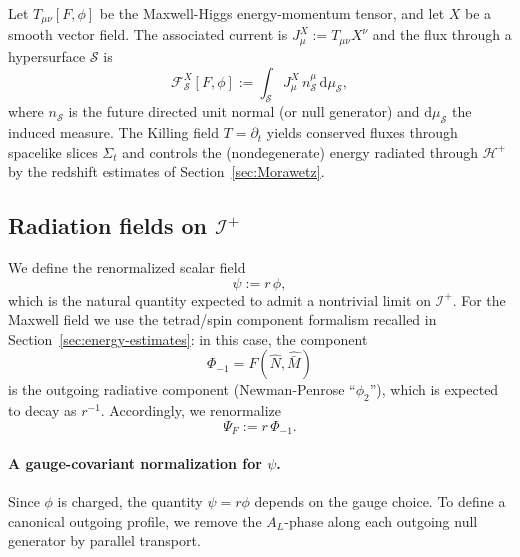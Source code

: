 \documentclass[11pt]{article}
\numberwithin{equation}{section}
\theoremstyle{plain}
\theoremstyle{definition}
\theoremstyle{remark}
\newcommand{\dd}{\mathrm{d}}
\begin{document}
Let $T_{\mu\nu}[F,\phi]$ be the Maxwell-Higgs energy-momentum tensor, and let $X$ be a smooth vector field.
The associated current is $J^X_\mu:=T_{\mu\nu}X^\nu$ and the flux through a hypersurface $\mathcal{S}$ is
\begin{equation}
\mathcal{F}^{X}_{\mathcal{S}}[F,\phi]:=\int_{\mathcal{S}} J^X_\mu\, n_{\mathcal{S}}^\mu\,\dd\mu_{\mathcal{S}},
\end{equation}
where $n_{\mathcal{S}}$ is the future directed unit normal (or null generator) and $\dd\mu_{\mathcal{S}}$ the induced measure.
The Killing field $T=\partial_t$ yields conserved fluxes through spacelike slices $\Sigma_t$ and controls the (nondegenerate) energy radiated through $\mathcal{H}^+$ by the redshift estimates of Section~\ref{sec:Morawetz}.

\subsection{Radiation fields on \texorpdfstring{$\mathcal{I}^+$}{I+}}
\label{subsec:radiation-fields}

We define the renormalized scalar field
\begin{equation}\label{eq:psi-def}
\psi:=r\,\phi,
\end{equation}
which is the natural quantity expected to admit a nontrivial limit on $\mathcal{I}^+$.
For the Maxwell field we use the tetrad/spin component formalism recalled in Section~\ref{sec:energy-estimates}:
in this case, the component
\begin{equation}
\Phi_{-1}=F(\hat N,\hat{\bar M})
\end{equation}
is the outgoing radiative component (Newman-Penrose ``$\phi_2$''), which is expected to decay as $r^{-1}$.
Accordingly, we renormalize
\begin{equation}\label{eq:maxwell-rad-renorm}
\Psi_F:=r\,\Phi_{-1}.
\end{equation}

\paragraph{A gauge-covariant normalization for $\psi$.}
Since $\phi$ is charged, the quantity $\psi=r\phi$ depends on the gauge choice.
To define a canonical outgoing profile, we remove the $A_L$-phase along each outgoing null generator by parallel transport.
\end{document}
